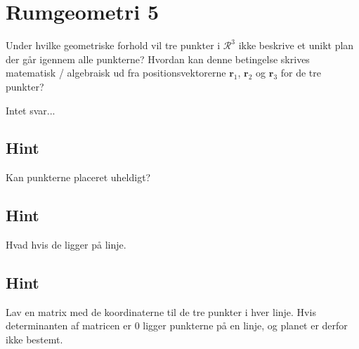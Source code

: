 \documentclass{article}
\newenvironment{exercise}[1]{\newpage\section{#1}}{}
\newcommand{\answerbox}[1]{\fbox{$#1$}}
\newcommand{\hint}{\subsection*{Hint}}
\begin{document}
\begin{exercise}{Rumgeometri 5}

Under hvilke geometriske forhold vil tre punkter i 
$\mathcal{R}^3$ ikke beskrive et unikt plan der går igennem
alle punkterne?
Hvordan kan denne betingelse skrives matematisk / algebraisk
ud fra positionsvektorerne $\mathbf{r}_1$, $\mathbf{r}_2$ og
$\mathbf{r}_3$ for de tre punkter?

Intet svar...
\answerbox{0}

\hint
Kan punkterne placeret uheldigt?

\hint
Hvad hvis de ligger på linje.

\hint
Lav en matrix med de koordinaterne til de tre punkter
i hver linje.
Hvis determinanten af matricen er 0 ligger punkterne på en linje, 
og planet er derfor ikke bestemt.

\end{exercise}
\end{document}
